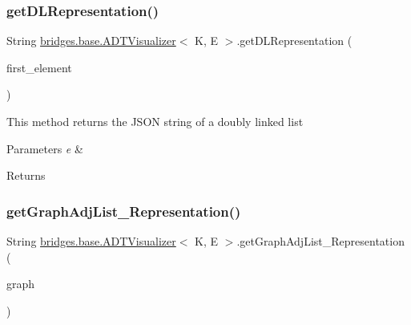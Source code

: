 \subsubsection{\texorpdfstring{get\+D\+L\+Representation()}{getDLRepresentation()}}
{\footnotesize\ttfamily String \hyperlink{classbridges_1_1base_1_1_a_d_t_visualizer}{bridges.\+base.\+A\+D\+T\+Visualizer}$<$ K, E $>$.get\+D\+L\+Representation (\begin{DoxyParamCaption}\item[{\hyperlink{classbridges_1_1base_1_1_d_lelement}{D\+Lelement}$<$ E $>$}]{first\+\_\+element }\end{DoxyParamCaption})}

This method returns the J\+S\+ON string of a doubly linked list 
\begin{DoxyParams}{Parameters}
{\em e} & \\
\hline
\end{DoxyParams}
\begin{DoxyReturn}{Returns}

\end{DoxyReturn}
\hypertarget{classbridges_1_1base_1_1_a_d_t_visualizer_a0b923e3a1afd3d56b5c42ef39e4c5542}{}\label{classbridges_1_1base_1_1_a_d_t_visualizer_a0b923e3a1afd3d56b5c42ef39e4c5542} 
\subsubsection{\texorpdfstring{get\+Graph\+Adj\+List\+\_\+\+Representation()}{getGraphAdjList\_Representation()}}
{\footnotesize\ttfamily String \hyperlink{classbridges_1_1base_1_1_a_d_t_visualizer}{bridges.\+base.\+A\+D\+T\+Visualizer}$<$ K, E $>$.get\+Graph\+Adj\+List\+\_\+\+Representation (\begin{DoxyParamCaption}\item[{\hyperlink{classbridges_1_1base_1_1_graph_adj_list}{Graph\+Adj\+List}$<$ K, E $>$}]{graph }\end{DoxyParamCaption})}

